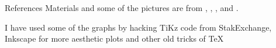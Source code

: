 \documentclass{beamer}
\begin{document}
\begin{frame}{References}
	Materials and some of the pictures are from \citep{James2015}, \citep{hastie01}, \citep{geron2}, and \citep{pestman}.
	\printbibliography 	
	
	I have used some of the graphs by hacking TiKz code from StakExchange, Inkscape for more aesthetic plots and other old tricks of \TeX
	
\end{frame}
\end{document}

